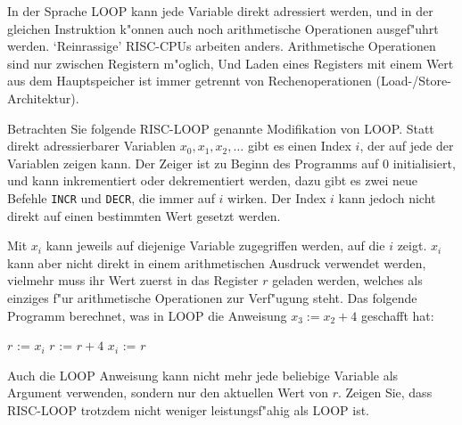 In der Sprache LOOP kann jede Variable direkt adressiert werden, und
in der gleichen Instruktion k"onnen auch noch arithmetische Operationen
ausgef"uhrt werden. `Reinrassige' RISC-CPUs arbeiten anders.
Arithmetische Operationen sind nur zwischen Registern m"oglich,
Und Laden eines Registers mit einem Wert aus dem Hauptspeicher ist
immer getrennt von Rechenoperationen (Load-/Store-Architektur).

Betrachten Sie folgende RISC-LOOP genannte Modifikation von LOOP.
Statt direkt adressierbarer Variablen
$x_0,x_1,x_2,\dots$ gibt es einen Index $i$, der auf jede der Variablen zeigen
kann. Der Zeiger ist zu Beginn des Programms auf $0$ initialisiert, und kann
inkrementiert oder dekrementiert werden, dazu gibt
es zwei neue Befehle {\tt INCR} und {\tt DECR}, die immer auf $i$
wirken.
Der Index $i$ kann jedoch nicht direkt auf einen bestimmten Wert gesetzt werden.

Mit $x_i$
kann jeweils auf diejenige Variable zugegriffen werden, auf die $i$ zeigt.
$x_i$ kann aber nicht direkt in einem arithmetischen Ausdruck verwendet werden,
vielmehr muss ihr Wert zuerst in das Register $r$ geladen werden, welches
als einziges f"ur arithmetische Operationen zur Verf"ugung steht. Das folgende
Programm berechnet, was in LOOP die Anweisung $x_3 := x_2 + 4$
geschafft hat:
\begin{algorithmic}[1]
\STATE $r$ := $x_i$
\STATE $r$ := $r + 4$
\STATE $x_i$ := $r$
\end{algorithmic}
Auch die LOOP Anweisung kann nicht mehr jede beliebige Variable als
Argument verwenden, sondern nur den aktuellen Wert von $r$.
Zeigen Sie, dass RISC-LOOP trotzdem nicht weniger leistungsf"ahig als
LOOP ist.

